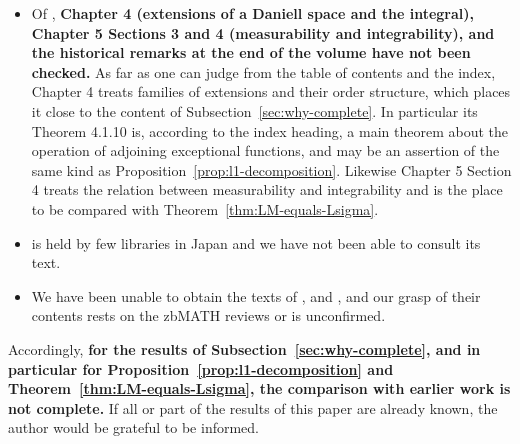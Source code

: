 \begin{itemize}
  \item Of \cite{CWS}, \textbf{Chapter 4 (extensions of a Daniell space and the
    integral), Chapter 5 Sections 3 and 4 (measurability and integrability),
    and the historical remarks at the end of the volume have not been
    checked.}
    As far as one can judge from the table of contents and the index,
    Chapter 4 treats families of extensions and their order structure, which
    places it close to the content of
    Subsection~\ref{sec:why-complete}.
    In particular its Theorem 4.1.10 is, according to the index heading, a main
    theorem about the operation of adjoining exceptional functions, and may be
    an assertion of the same kind as
    Proposition~\ref{prop:l1-decomposition}.
    Likewise Chapter 5 Section 4 treats the relation between measurability and
    integrability and is the place to be compared with
    Theorem~\ref{thm:LM-equals-Lsigma}.
  \item \cite{CFW} is held by few libraries in Japan and we have not been able
    to consult its text.
  \item We have been unable to obtain the texts of
    \cite{BorgerHabil}, \cite{M1989} and \cite{JM1974}, and our grasp of their
    contents rests on the zbMATH reviews or is unconfirmed.
\end{itemize}

\noindent
Accordingly, \textbf{for the results of
Subsection~\ref{sec:why-complete}, and in particular for
Proposition~\ref{prop:l1-decomposition} and
Theorem~\ref{thm:LM-equals-Lsigma}, the comparison with earlier work is not
complete.}
If all or part of the results of this paper are already known, the author would
be grateful to be informed.
